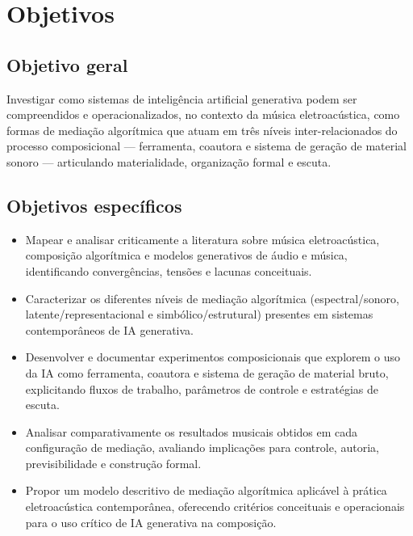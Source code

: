 \chapter{Objetivos}

\section{Objetivo geral}

Investigar como sistemas de inteligência artificial generativa podem ser compreendidos e operacionalizados, no contexto da música eletroacústica, como formas de mediação algorítmica que atuam em três níveis inter-relacionados do processo composicional — ferramenta, coautora e sistema de geração de material sonoro — articulando materialidade, organização formal e escuta.

\section{Objetivos específicos}

\begin{itemize}
  \item Mapear e analisar criticamente a literatura sobre música eletroacústica, composição algorítmica e modelos generativos de áudio e música, identificando convergências, tensões e lacunas conceituais.
  
  \item Caracterizar os diferentes níveis de mediação algorítmica (espectral/sonoro, latente/representacional e simbólico/estrutural) presentes em sistemas contemporâneos de IA generativa.
  
  \item Desenvolver e documentar experimentos composicionais que explorem o uso da IA como ferramenta, coautora e sistema de geração de material bruto, explicitando fluxos de trabalho, parâmetros de controle e estratégias de escuta.
  
  \item Analisar comparativamente os resultados musicais obtidos em cada configuração de mediação, avaliando implicações para controle, autoria, previsibilidade e construção formal.
  
  \item Propor um modelo descritivo de mediação algorítmica aplicável à prática eletroacústica contemporânea, oferecendo critérios conceituais e operacionais para o uso crítico de IA generativa na composição.
\end{itemize}
